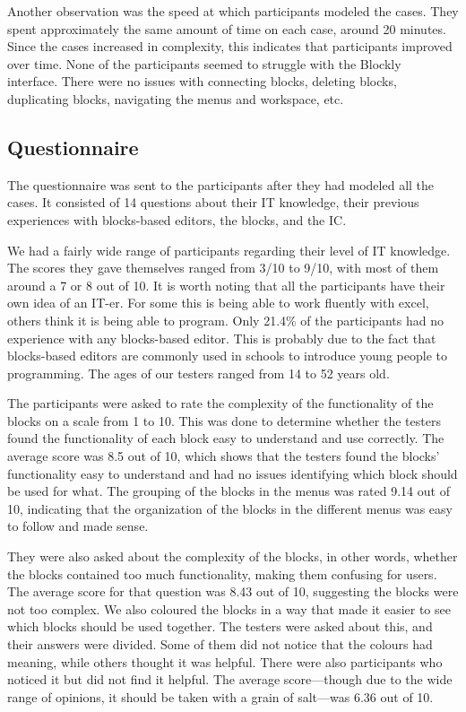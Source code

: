 \documentclass[11pt,a4paper]{report}
\begin{document}
\begin{idplisting}
Another observation was the speed at which participants modeled the cases. They spent approximately the same amount of time on each case, around 20 minutes. Since the cases increased in complexity, this indicates that participants improved over time. None of the participants seemed to struggle with the Blockly~\cite{Blockly} interface. There were no issues with connecting blocks, deleting blocks, duplicating blocks, navigating the menus and workspace, etc.


\subsection{Questionnaire}
The questionnaire was sent to the participants after they had modeled all the cases. It consisted of 14 questions about their IT knowledge, their previous experiences with blocks-based editors, the blocks, and the IC.

We had a fairly wide range of participants regarding their level of IT knowledge. The scores they gave themselves ranged from 3/10 to 9/10, with most of them around a 7 or 8 out of 10. It is worth noting that all the participants have their own idea of an IT-er. For some this is being able to work fluently with excel, others think it is being able to program. Only 21.4\% of the participants had no experience with any blocks-based editor. This is probably due to the fact that blocks-based editors are commonly used in schools to introduce young people to programming. The ages of our testers ranged from 14 to 52 years old.

The participants were asked to rate the complexity of the functionality of the blocks on a scale from 1 to 10. This was done to determine whether the testers found the functionality of each block easy to understand and use correctly. The average score was 8.5 out of 10, which shows that the testers found the blocks' functionality easy to understand and had no issues identifying which block should be used for what. The grouping of the blocks in the menus was rated 9.14 out of 10, indicating that the organization of the blocks in the different menus was easy to follow and made sense.

They were also asked about the complexity of the blocks, in other words, whether the blocks contained too much functionality, making them confusing for users. The average score for that question was 8.43 out of 10, suggesting the blocks were not too complex. We also coloured the blocks in a way that made it easier to see which blocks should be used together. The testers were asked about this, and their answers were divided. Some of them did not notice that the colours had meaning, while others thought it was helpful. There were also participants who noticed it but did not find it helpful. The average score—though due to the wide range of opinions, it should be taken with a grain of salt—was 6.36 out of 10.


\end{idplisting}
\end{document}

